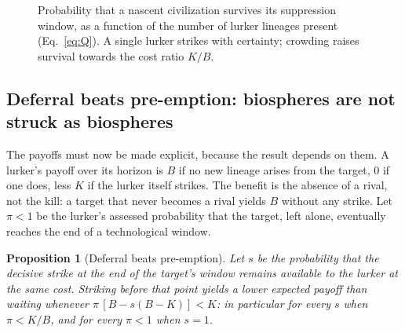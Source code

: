\documentclass[preprint,12pt]{elsarticle}
\newtheorem{proposition}{Proposition}
\theoremstyle{definition}
\begin{document}
\begin{figure}[!htbp]
\centering
{}
\caption{Probability that a nascent civilization survives its suppression window, as a function of the number of lurker lineages present (Eq.~\ref{eq:Q}). A single lurker strikes with certainty; crowding raises survival towards the cost ratio $K/B$.}
\label{fig:Q}
\end{figure}

\subsection{Deferral beats pre-emption: biospheres are not struck as biospheres}
\label{sec:biosphere}

The payoffs must now be made explicit, because the result depends on them. A lurker's payoff over its horizon is $B$ if no new lineage arises from the target, $0$ if one does, less $K$ if the lurker itself strikes. The benefit is the absence of a rival, not the kill: a target that never becomes a rival yields $B$ without any strike. Let $\pi < 1$ be the lurker's assessed probability that the target, left alone, eventually reaches the end of a technological window.

\begin{proposition}[Deferral beats pre-emption]
\label{prop:biosphere}
Let $s$ be the probability that the decisive strike at the end of the target's window remains available to the lurker at the same cost. Striking before that point yields a lower expected payoff than waiting whenever $\pi\,[B - s(B-K)] < K$: in particular for every $s$ when $\pi < K/B$, and for every $\pi < 1$ when $s = 1$.
\end{proposition}
\end{document}
